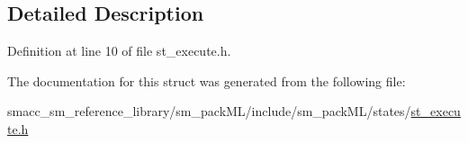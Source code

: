 \subsection{Detailed Description}


Definition at line 10 of file st\+\_\+execute.\+h.



The documentation for this struct was generated from the following file\+:\begin{DoxyCompactItemize}
\item 
smacc\+\_\+sm\+\_\+reference\+\_\+library/sm\+\_\+pack\+M\+L/include/sm\+\_\+pack\+M\+L/states/\hyperlink{sm__packML_2include_2sm__packML_2states_2st__execute_8h}{st\+\_\+execute.\+h}\end{DoxyCompactItemize}
